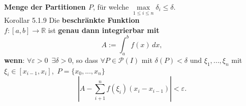 \documentclass[landscape, 10pt]{article}
\newcommand{\R}{\mathbb{R}}
\begin{document}
\begin{multicols}{3}
                     \textbf{Menge der Partitionen $P$}, 
                     für welche 
                     \textcolor{NavyBlue}{
                     $\max\limits_{1\leqslant i
                     \leqslant n}\delta_i
                     \leqslant\delta$}. \\
              \colorbox{BurntOrange}{Korollar 5.1.9} 
                     Die \textbf{beschränkte Funktion} \\
                     \textcolor{NavyBlue}{
                     $f:[a,b]\longrightarrow\R$} ist 
                     \textbf{genau dann integrierbar mit}
                     \begin{equation*}
                            A:=\int_a^bf(x)\,dx,
                     \end{equation*}
                     \textbf{wenn}: 
                     \textcolor{NavyBlue}{
                     $\forall\varepsilon>0\enspace
                     \exists\delta>0$}, so dass 
                     \textcolor{NavyBlue}{
                     $\forall P\in\mathcal{P}(I)$} mit 
                     \textcolor{NavyBlue}{$\delta(P)<\delta$}
                     und \textcolor{NavyBlue}{
                     $\xi_1,...,\xi_n$} mit 
                     \textcolor{NavyBlue}{
                     $\xi_i\in[x_{i-1},x_i]$},\,
                     \textcolor{NavyBlue}{$P=\{x_0,...,x_n\}$} 
                     \begin{equation*}
                            |A-\sum_{i+1}^nf(\xi_i)
                            (x_i-x_{i-1})|
                            <\varepsilon.
                     \end{equation*}

\end{multicols}
\end{document}
